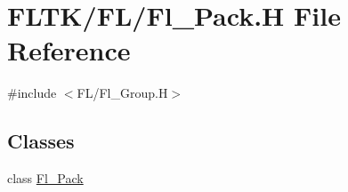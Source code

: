 \hypertarget{_fl___pack_8_h}{}\section{F\+L\+T\+K/\+F\+L/\+Fl\+\_\+\+Pack.H File Reference}
\label{_fl___pack_8_h}
{\ttfamily \#include $<$F\+L/\+Fl\+\_\+\+Group.\+H$>$}\newline
\subsection*{Classes}
\begin{DoxyCompactItemize}
\item 
class \hyperlink{class_fl___pack}{Fl\+\_\+\+Pack}
\end{DoxyCompactItemize}
